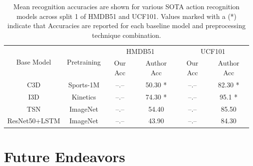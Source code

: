 \documentclass{llncs}
\begin{document}
\begin{table}[tp!]
\begin{center}
\caption{Mean recognition accuracies are shown for various SOTA action recognition models across split 1 of HMDB51 and UCF101.
Values marked with a (*) indicate that  
Accuracies are reported for each baseline model and preprocessing technique combination.}
\label{tab:model_results}
\begin{tabular}{c|c|c|c||c|c}
\hline
\multirow{2}{*}{Base Model} & \multirow{2}{*}{Pretraining} & \multicolumn{2}{c||}{HMDB51} & \multicolumn{2}{c}{UCF101} \\\cline{3-6}
& & Our Acc & Author Acc & Our Acc & Author Acc \\
\hline
C3D & Sports-1M & --.-- & 50.30 * & --.-- & 82.30 * \\
\hline
I3D & Kinetics & --.-- & 74.30 * & --.-- & 95.1 * \\
\hline
TSN & ImageNet & --.-- & 54.40 & --.-- & 85.50 \\
\hline
ResNet50+LSTM & ImageNet & --.-- & 43.90 & --.-- & 84.30 \\
\hline
\end{tabular}
\end{center}
\end{table}


\section{Future Endeavors}
\label{sec:future}

\clearpage



\end{document}
